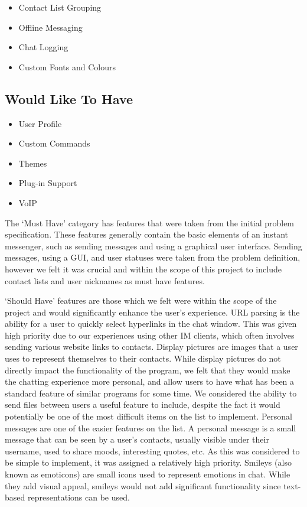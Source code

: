 \begin{itemize}
\item{Contact List Grouping}
\item{Offline Messaging}
\item{Chat Logging}
\item{Custom Fonts and Colours}
\end{itemize}

\subsection{Would Like To Have}

\begin{itemize}
\item{User Profile}
\item{Custom Commands}
\item{Themes}
\item{Plug-in Support}
\item{VoIP}
\end{itemize}

The `Must Have' category has features that were taken from the initial problem specification. These features generally contain the basic elements of an instant messenger, such as sending messages and using a graphical user interface. Sending messages, using a GUI, and user statuses were taken from the problem definition, however we felt it was crucial and within the scope of this project to include contact lists and user nicknames as must have features.

`Should Have' features are those which we felt were within the scope of the project and would significantly enhance the user's experience. URL parsing is the ability for a user to quickly select hyperlinks in the chat window. This was given high priority due to our experiences using other IM clients, which often involves sending various website links to contacts. Display pictures are images that a user uses to represent themselves to their contacts. While display pictures do not directly impact the functionality of the program, we felt that they would make the chatting experience more personal, and allow users to have what has been a standard feature of similar programs for some time. We considered the ability to send files between users a useful feature to include, despite the fact it would potentially be one of the most difficult items on the list to implement. Personal messages are one of the easier features on the list. A personal message is a small message that can be seen by a user's contacts, usually visible under their username, used to share moods, interesting quotes, etc. As this was considered to be simple to implement, it was assigned a relatively high priority. Smileys (also known as emoticons) are small icons used to represent emotions in chat. While they add visual appeal, smileys would not add significant functionality since text-based representations can be used.

